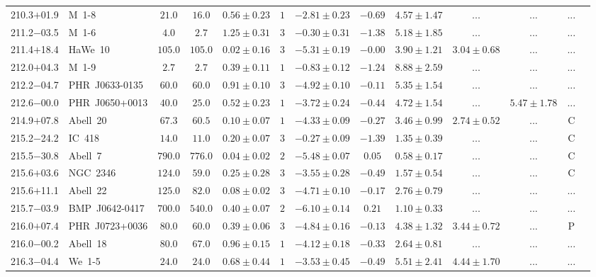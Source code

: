 \documentclass[useAMS]{mn2e}
\begin{document}
\begin{center}
{\begin{longtable}{llccccccccccc}
210.3$+$01.9&M~1-8&$      21.0$&$      16.0$&$0.56 \pm 0.23$&$1$&$-2.81 \pm 0.23$&$     -0.69$&$4.57 \pm 1.47$&$...$&$...$&...\\
211.2$-$03.5&M~1-6&$       4.0$&$       2.7$&$1.25 \pm 0.31$&$3$&$-0.30 \pm 0.31$&$     -1.38$&$5.18 \pm 1.85$&$...$&$...$&...\\
211.4$+$18.4&HaWe~10&$     105.0$&$     105.0$&$0.02 \pm 0.16$&$3$&$-5.31 \pm 0.19$&$     -0.00$&$3.90 \pm 1.21$&$3.04 \pm 0.68$&$...$&...\\
212.0$+$04.3&M~1-9&$       2.7$&$       2.7$&$0.39 \pm 0.11$&$1$&$-0.83 \pm 0.12$&$     -1.24$&$8.88 \pm 2.59$&$...$&$...$&...\\
212.2$-$04.7&PHR~J0633-0135&$      60.0$&$      60.0$&$0.91 \pm 0.10$&$3$&$-4.92 \pm 0.10$&$     -0.11$&$5.35 \pm 1.54$&$...$&$...$&...\\
212.6$-$00.0&PHR~J0650+0013&$      40.0$&$      25.0$&$0.52 \pm 0.23$&$1$&$-3.72 \pm 0.24$&$     -0.44$&$4.72 \pm 1.54$&$...$&$5.47 \pm 1.78$&...\\
214.9$+$07.8&Abell~20&$      67.3$&$      60.5$&$0.10 \pm 0.07$&$1$&$-4.33 \pm 0.09$&$     -0.27$&$3.46 \pm 0.99$&$2.74 \pm 0.52$&$...$&C\\
215.2$-$24.2&IC~418&$      14.0$&$      11.0$&$0.20 \pm 0.07$&$3$&$-0.27 \pm 0.09$&$     -1.39$&$1.35 \pm 0.39$&$...$&$...$&C\\
215.5$-$30.8&Abell~7&$     790.0$&$     776.0$&$0.04 \pm 0.02$&$2$&$-5.48 \pm 0.07$&$      0.05$&$0.58 \pm 0.17$&$...$&$...$&C\\
215.6$+$03.6&NGC~2346&$     124.0$&$      59.0$&$0.25 \pm 0.28$&$3$&$-3.55 \pm 0.28$&$     -0.49$&$1.57 \pm 0.54$&$...$&$...$&C\\
215.6$+$11.1&Abell~22&$     125.0$&$      82.0$&$0.08 \pm 0.02$&$3$&$-4.71 \pm 0.10$&$     -0.17$&$2.76 \pm 0.79$&$...$&$...$&...\\
215.7$-$03.9&BMP~J0642-0417&$     700.0$&$     540.0$&$0.40 \pm 0.07$&$2$&$-6.10 \pm 0.14$&$      0.21$&$1.10 \pm 0.33$&$...$&$...$&...\\
216.0$+$07.4&PHR~J0723+0036&$      80.0$&$      60.0$&$0.39 \pm 0.06$&$3$&$-4.84 \pm 0.16$&$     -0.13$&$4.38 \pm 1.32$&$3.44 \pm 0.72$&$...$&P\\
216.0$-$00.2&Abell~18&$      80.0$&$      67.0$&$0.96 \pm 0.15$&$1$&$-4.12 \pm 0.18$&$     -0.33$&$2.64 \pm 0.81$&$...$&$...$&...\\
216.3$-$04.4&We~1-5&$      24.0$&$      24.0$&$0.68 \pm 0.44$&$1$&$-3.53 \pm 0.45$&$     -0.49$&$5.51 \pm 2.41$&$4.44 \pm 1.70$&$...$&...\\

\end{longtable}}
\end{center}
\end{document}
